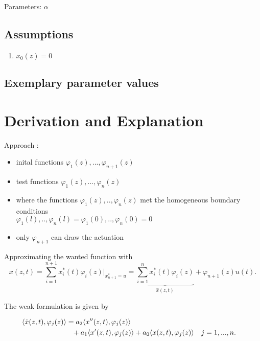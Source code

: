 \documentclass[10pt,a4paper]{article}
\begin{document}
	\noindent
	Parameters: $\alpha$ %

	
	
	\subsection{Assumptions} %
		\begin{enumerate} %
			\item $x_0(z)=0$
		\end{enumerate}
	
	
	\subsection{Exemplary parameter values}
	

	
	\section{Derivation and Explanation} %
	Approach \cite{pyinduct}: 
	\begin{itemize}
		\item inital functions $\varphi_1(z),...,\varphi_{n+1}(z)$
		\item test functions $\varphi_1(z),...,\varphi_n(z)$
		\item where the functions $\varphi_1(z),..,\varphi_n(z)$ met the homogeneous boundary conditions\\
			$\varphi_1(l),..,\varphi_n(l)=\varphi_1(0),..,\varphi_n(0)=0$
		\item only $\varphi_{n+1}$ can draw the actuation
	\end{itemize}
	Approximating the wanted function with
	\begin{equation*}
		x(z,t) = \sum_{i=1}^{n+1} x_i^*(t) \varphi_i(z)\Big|_{x^*_{n+1}=u} =  \underbrace{\sum_{i=1}^{n} x_i^*(t) \varphi_i(z)}_{\hat x(z,t)} + \varphi_{n+1}(z) u(t).
	\end{equation*}

	\noindent The weak formulation is given by

	\begin{align*}
		\langle\dot{x}(z,t),\varphi_j(z)\rangle &=
		a_2 \langle x''(z,t),\varphi_j(z)\rangle \\
		&\hphantom =+
		a_1 \langle x'(z,t), \varphi_j(z)\rangle  +
		a_0 \langle x(z,t), \varphi_j(z)\rangle && j=1,...,n.
	\end{align*}
\end{document}
